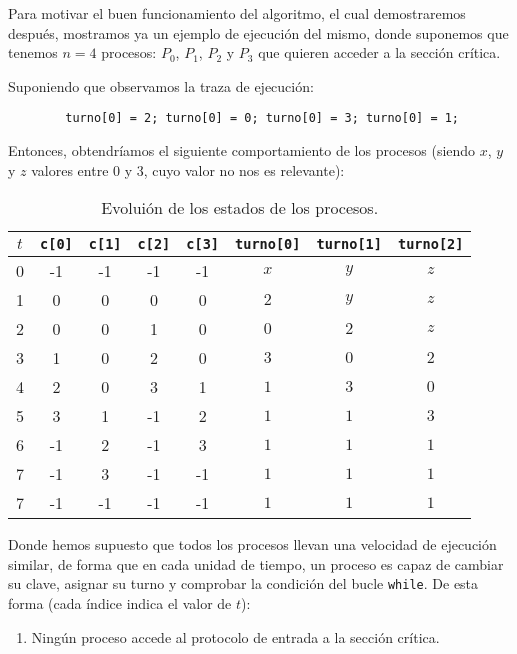\begin{ejemplo}
    Para motivar el buen funcionamiento del algoritmo, el cual demostraremos después, mostramos ya un ejemplo de ejecución del mismo, donde suponemos que tenemos $n=4$ procesos: $P_0$, $P_1$, $P_2$ y $P_3$ que quieren acceder a la sección crítica.

    Suponiendo que observamos la traza de ejecución:
    \begin{verbatim}
        turno[0] = 2; turno[0] = 0; turno[0] = 3; turno[0] = 1;
    \end{verbatim}
    Entonces, obtendríamos el siguiente comportamiento de los procesos (siendo $x$, $y$ y $z$ valores entre 0 y 3, cuyo valor no nos es relevante):
    \begin{table}[H]
    \centering
    \begin{tabular}{|c|c|c|c|c|c|c|c|}
        \hline
        $t$ & \verb|c[0]| & \verb|c[1]| & \verb|c[2]| & \verb|c[3]| & \verb|turno[0]| & \verb|turno[1]| & \verb|turno[2]| \\
        \hline
        0 & -1 & -1 & -1 & -1 & $x$ & $y$ & $z$ \\
        \hline
        1 & 0 & 0 & 0 & 0 & $2$ & $y$ & $z$ \\
        \hline
        2 & 0 & 0 & 1 & 0 & $0$ & $2$ & $z$ \\
        \hline
        3 & 1 & 0 & 2 & 0 & $3$ & $0$ & $2$ \\
        \hline
        4 & 2 & 0 & 3 & 1 & $1$ & $3$ & $0$ \\
        \hline
        5 & 3 & 1 & -1 & 2 & $1$ & $1$ & $3$ \\
        \hline
        6 & -1 & 2 & -1 & 3 & $1$ & $1$ & $1$ \\
        \hline
        7 & -1 & 3 & -1 & -1 & $1$ & $1$ & $1$ \\
        \hline
        7 & -1 & -1 & -1 & -1 & $1$ & $1$ & $1$ \\
        \hline
    \end{tabular}
    \caption{Evoluión de los estados de los procesos.}
    \end{table}
    Donde hemos supuesto que todos los procesos llevan una velocidad de ejecución similar, de forma que en cada unidad de tiempo, un proceso es capaz de cambiar su clave, asignar su turno y comprobar la condición del bucle \verb|while|. De esta forma (cada índice indica el valor de $t$):
    \begin{enumerate}[label=(\arabic*), start=0]
        \item Ningún proceso accede al protocolo de entrada a la sección crítica.

\end{enumerate}
\end{ejemplo}
